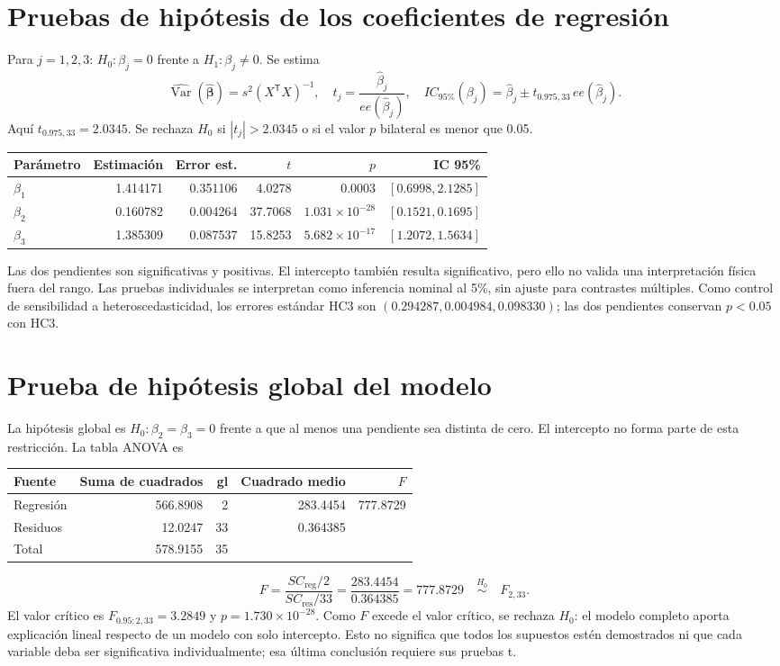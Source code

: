 \documentclass[11pt,a4paper]{article}
\begin{document}
\section{Pruebas de hipótesis de los coeficientes de regresión}
Para $j=1,2,3$: $H_0:\beta_j=0$ frente a $H_1:\beta_j\ne0$. Se estima
\[
\widehat{\operatorname{Var}}(\widehat{\boldsymbol\beta})
=s^2(X^{\mathsf T}X)^{-1},\quad
t_j=\frac{\hat\beta_j}{ee(\hat\beta_j)},\quad
IC_{95\%}(\beta_j)=\hat\beta_j\pm t_{0.975,33}\,ee(\hat\beta_j).
\]
Aquí $t_{0.975,33}=2.0345$. Se rechaza $H_0$ si $|t_j|>2.0345$ o si el valor $p$ bilateral es menor que 0.05.
\begin{center}\small
\begin{tabular}{lrrrrr}\toprule
Parámetro & Estimación & Error est. & $t$ & $p$ & IC 95\%\\\midrule
$\beta_{1}$ & 1.414171 & 0.351106 & 4.0278 & $0.0003$ & $[0.6998,2.1285]$\\
$\beta_{2}$ & 0.160782 & 0.004264 & 37.7068 & $1.031\times10^{-28}$ & $[0.1521,0.1695]$\\
$\beta_{3}$ & 1.385309 & 0.087537 & 15.8253 & $5.682\times10^{-17}$ & $[1.2072,1.5634]$\\
\bottomrule\end{tabular}\end{center}
Las dos pendientes son significativas y positivas. El intercepto también resulta significativo, pero ello no valida una interpretación física fuera del rango. Las pruebas individuales se interpretan como inferencia nominal al 5\%, sin ajuste para contrastes múltiples. Como control de sensibilidad a heteroscedasticidad, los errores estándar HC3 son $(0.294287,0.004984,0.098330)$; las dos pendientes conservan $p<0.05$ con HC3.

\section{Prueba de hipótesis global del modelo}
La hipótesis global es $H_0:\beta_2=\beta_3=0$ frente a que al menos una pendiente sea distinta de cero. El intercepto no forma parte de esta restricción. La tabla ANOVA es
\begin{center}
\begin{tabular}{lrrrr}\toprule
Fuente & Suma de cuadrados & gl & Cuadrado medio & $F$\\\midrule
Regresión & 566.8908 & 2 & 283.4454 & 777.8729\\
Residuos & 12.0247 & 33 & 0.364385 & \\
Total & 578.9155 & 35 & & \\\bottomrule
\end{tabular}\end{center}
\[
F=\frac{SC_{\mathrm{reg}}/2}{SC_{\mathrm{res}}/33}
=\frac{283.4454}{0.364385}=777.8729
\quad\overset{H_0}{\sim}\quad F_{2,33}.
\]
El valor crítico es $F_{0.95;2,33}=3.2849$ y $p=1.730\times10^{-28}$. Como $F$ excede el valor crítico, se rechaza $H_0$: el modelo completo aporta explicación lineal respecto de un modelo con solo intercepto. Esto no significa que todos los supuestos estén demostrados ni que cada variable deba ser significativa individualmente; esa última conclusión requiere sus pruebas t.
\end{document}
